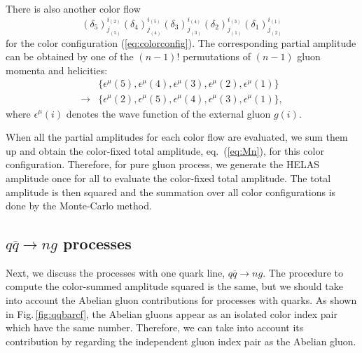 There is also another color flow
\begin{equation}
(\delta_5)^{i_{(2)}}_{j_{(5)}}(\delta_4)^{i_{(5)}}_{j_{(4)}}(\delta_3)^{i_{(4)}}_{j_{(3)}}(\delta_2)^{i_{(3)}}_{j_{(1)}}(\delta_1)^{i_{(1)}}_{j_{(2)}}
\label{eq:cf2}
\end{equation}
for the color configuration (\ref{eq:colorconfig}). The corresponding partial
amplitude can be obtained by one of the $(n-1)!$ permutations of $(n-1)$ gluon momenta and
helicities:
\begin{align}
&\bigl\{\epsilon^{\mu}(5),\epsilon^{\mu}(4),\epsilon^{\mu}(3),\epsilon^{\mu}(2),\epsilon^{\mu}(1)\bigr\}\nonumber\\
\rightarrow& \bigl\{\epsilon^{\mu}(2),\epsilon^{\mu}(5),\epsilon^{\mu}(4),\epsilon^{\mu}(3),\epsilon^{\mu}(1)\bigr\},
\end{align}
where $\epsilon^{\mu}(i)$ denotes the wave function of the external
 gluon $g(i)$.

 When all the partial amplitudes for each color flow are
 evaluated, we sum them up and obtain the color-fixed total
amplitude, eq.~(\ref{eq:Mn}), for this color configuration. Therefore,
for pure gluon process, we generate the HELAS amplitude once for all to evaluate
the color-fixed total amplitude. The total amplitude is then squared and
 the summation over all color
configurations is done by the
Monte-Carlo method.

\subsection{$q\overline{q}\rightarrow ng$ processes}
\label{qqx}
Next, we discuss the processes with one quark line,
$q\overline{q}\rightarrow ng$. The procedure to compute the color-summed amplitude squared is the same, but we should take into account
the Abelian gluon contributions for processes with quarks. As shown in Fig.\,\ref{fig:qqbarcf}, the Abelian gluons appear
as an isolated color index pair which have the same number. Therefore, we can take into account its contribution by regarding the independent gluon index pair as the
Abelian gluon.

